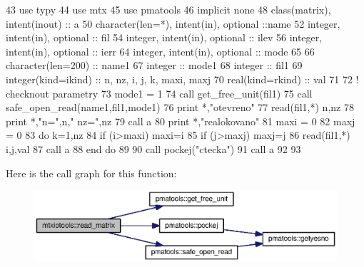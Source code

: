 \begin{DoxyCode}
43         \textcolor{keywordtype}{use }typy
44         \textcolor{keywordtype}{use }mtx
45         \textcolor{keywordtype}{use }pmatools
46         \textcolor{keywordtype}{implicit none}
48         \textcolor{keywordtype}{class}(matrix), \textcolor{keywordtype}{intent(inout)} :: a
50         \textcolor{keywordtype}{character(len=*)}, \textcolor{keywordtype}{intent(in)}, \textcolor{keywordtype}{optional} ::name
52         \textcolor{keywordtype}{integer}, \textcolor{keywordtype}{intent(in)}, \textcolor{keywordtype}{optional} :: fil
54         \textcolor{keywordtype}{integer}, \textcolor{keywordtype}{intent(in)}, \textcolor{keywordtype}{optional} :: ilev
56         \textcolor{keywordtype}{integer}, \textcolor{keywordtype}{intent(in)}, \textcolor{keywordtype}{optional} :: ierr
64         \textcolor{keywordtype}{integer}, \textcolor{keywordtype}{intent(in)}, \textcolor{keywordtype}{optional} :: mode
65 
66         \textcolor{keywordtype}{character(len=200)} :: name1
67         \textcolor{keywordtype}{integer} :: mode1
68         \textcolor{keywordtype}{integer} :: fil1
69         \textcolor{keywordtype}{integer(kind=ikind)} :: n, nz, i, j, k, maxi, maxj
70         \textcolor{keywordtype}{real(kind=rkind)} :: val
71 
72         \textcolor{comment}{! checknout parametry
}
73         mode1 = 1
74         \textcolor{keyword}{call }get_free_unit(fil1)
75         \textcolor{keyword}{call }safe_open_read(name1,fil1,mode1)
76         print *,\textcolor{stringliteral}{"otevreno"}
77         \textcolor{keyword}{read}(fil1,*) n,nz
78         print *,\textcolor{stringliteral}{"n="},n,\textcolor{stringliteral}{" nz="},nz
79         \textcolor{keyword}{call }a%
80         print *,\textcolor{stringliteral}{"realokovano"}
81         maxi = 0
82         maxj = 0
83         \textcolor{keywordflow}{do} k=1,nz
84             \textcolor{keywordflow}{if} (i>maxi) maxi=i
85             \textcolor{keywordflow}{if} (j>maxj) maxj=j
86             \textcolor{keyword}{read}(fil1,*) i,j,val
87             \textcolor{keyword}{call }a%
88 \textcolor{keyword}{        end }do
89 
90         \textcolor{keyword}{call }pockej(\textcolor{stringliteral}{"ctecka"})
91         \textcolor{keyword}{call }a%
92 
93 
\end{DoxyCode}


Here is the call graph for this function\+:\nopagebreak
\begin{figure}[H]
\begin{center}
\leavevmode
\includegraphics[width=350pt]{namespacemtxiotools_a03531e01ee904b60f26175fbe1807d8a_cgraph}
\end{center}
\end{figure}


